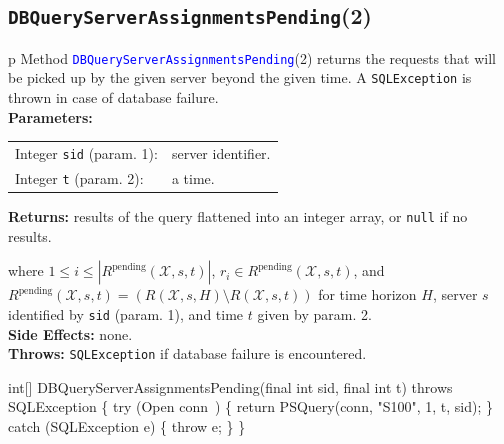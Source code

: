 \subsection{\texttt{DBQueryServerAssignmentsPending}(2)}
\begin{tabular}{p{\textwidth}}
\toprule
{}
Method \textcolor{blue}{{\tt{}\protect{}DBQueryServerAssignmentsPending}}(2) returns the
requests that will be picked up by the given server beyond the given time.
A {\tt{}SQLException} is thrown in case of database failure.\\
\midrule
\textbf{Parameters:} \\
\begin{tabular}{lp{116mm}}
Integer {\tt{}sid} (param. 1):&server identifier.\\
Integer {\tt{}t} (param. 2):&a time.\\
\end{tabular}
\textbf{Returns:} results of the query flattened into an integer array,
or {\tt{}null} if no results.


where $1\leq i\leq |R^\textrm{pending}(\mathcal{X}, s, t)|$,
$r_i\in R^\textrm{pending}(\mathcal{X}, s, t)$, and
$R^\textrm{pending}(\mathcal{X}, s, t)= (R(\mathcal{X},s,H)\setminus R(\mathcal{X},s,t))$ for
time horizon $H$, server $s$ identified by {\tt{}sid} (param. 1), and time $t$ given by param. 2.\\
\textbf{Side Effects:} none.\\
\textbf{Throws:} {\tt{}SQLException} if database failure is encountered.\\
\bottomrule
\end{tabular}
\nwenddocs{}\endmoddef{}
int[] DBQueryServerAssignmentsPending(final int sid, final int t)
throws SQLException \{
  try (\LA{}Open \code{}conn\edoc{}~{\nwtagstyle{}}\RA{}) \{
    return PSQuery(conn, "S100", 1, t, sid);
  \} catch (SQLException e) \{
    throw e;
  \}
\}
\eatline
{}\nwendcode{}\nwdocspar
